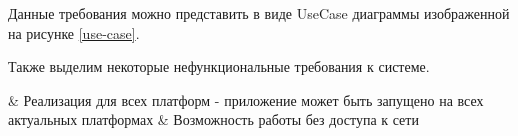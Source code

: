 Данные требования можно представить в виде UseCase диаграммы изображенной на рисунке \ref{use-case}.


Также выделим некоторые нефункциональные требования к системе.
\begin{easylist}
  & Реализация для всех платформ - приложение может быть запущено на всех актуальных платформах
  & Возможность работы без доступа к сети
\end{easylist}